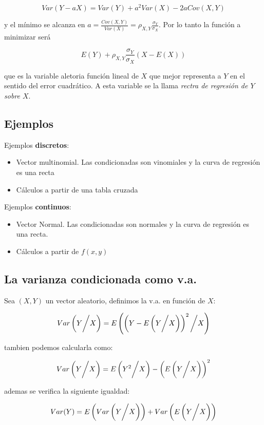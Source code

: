 \[ Var(Y - aX) = Var(Y) + a^2Var(X) - 2aCov(X,Y) \]

y el mínimo se alcanza en $a = \frac{Cov(X,Y)}{Var(X)} = \rho_{X,Y}\frac{\sigma_Y}{\sigma_X}$. Por lo tanto la función a minimizar será

\[ E(Y) + \rho_{X,Y}\frac{\sigma_Y}{\sigma_X}(X - E(X)) \]

que es la variable aletoria función lineal de $X$ que mejor representa a $Y$ en el sentido del error cuadrático. A esta variable
se la llama \textit{rectra de regresión de $Y$ sobre $X$}.

\subsection{Ejemplos}

Ejemplos \textbf{discretos}:
\begin{itemize}
    \item Vector multinomial. Las condicionadas son vinomiales y la curva de regresión es una recta
    \item Cálculos a partir de una tabla cruzada
\end{itemize}
Ejemplos \textbf{continuos}:
\begin{itemize}
    \item Vector Normal. Las condicionadas son normales y la curva de regresión es una recta.
    \item Cálculos a partir de $f(x,y)$
\end{itemize}

\subsection{La varianza condicionada como v.a.}

Sea $(X,Y)$ un vector aleatorio, definimos la v.a. en función de $X$:

\[ Var\left( Y \bigg{/} X \right) = E\left( \left( Y - E \left( Y \bigg{/} X \right) \right)^2 \bigg{/} X \right)\]

tambien podemos calcularla como:

\[ Var\left( Y \bigg{/} X \right) = E\left( Y^2 \bigg{/} X \right) - \left( E\left( Y \bigg{/} X \right) \right)^2 \]

ademas se verifica la siguiente igualdad:

\[ Var(Y) = E\left( Var\left( Y \bigg{/} X \right) \right) + Var\left( E\left( Y \bigg{/} X \right) \right) \]
